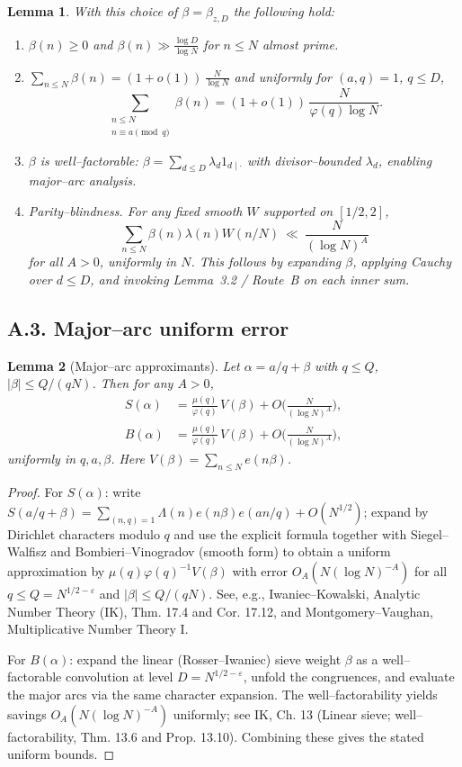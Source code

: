 \documentclass[11pt]{article}
\newtheorem{lemma}{Lemma}[section]
\theoremstyle{definition}
\theoremstyle{remark}
\begin{document}
\begin{lemma}\label{lem:beta-properties}
With this choice of $\beta=\beta_{z,D}$ the following hold:
\begin{enumerate}[label=(B\arabic*)]
\item $\beta(n)\ge 0$ and $\beta(n)\gg \frac{\log D}{\log N}$ for $n\le N$ almost prime.
\item $\sum_{n\le N}\beta(n)=(1+o(1))\,\tfrac{N}{\log N}$ and uniformly for $(a,q)=1$, $q\le D$,
\[
\sum_{\substack{n\le N\\ n\equiv a\pmod q}}\beta(n)
=(1+o(1))\,\frac{N}{\varphi(q)\log N}.
\]
\item $\beta$ is well--factorable: $\beta=\sum_{d\le D}\lambda_d 1_{d\mid\cdot}$ with divisor--bounded $\lambda_d$, enabling major--arc analysis.
\item \emph{Parity--blindness.} For any fixed smooth $W$ supported on $[1/2,2]$,
\[
\sum_{n\le N}\beta(n)\lambda(n)W(n/N)
\ \ll\ \frac{N}{(\log N)^A}
\]
for all $A>0$, uniformly in $N$. This follows by expanding $\beta$, applying Cauchy over $d\le D$, and invoking Lemma~3.2 / Route~B on each inner sum.
\end{enumerate}
\end{lemma}

\subsection*{A.3. Major--arc uniform error}

\begin{lemma}[Major--arc approximants]\label{lem:major-errors}
Let $\alpha=a/q+\beta$ with $q\le Q$, $|\beta|\le Q/(qN)$. Then for any $A>0$,
\begin{align*}
S(\alpha)&=\frac{\mu(q)}{\varphi(q)}\,V(\beta)+O\!\Big(\frac{N}{(\log N)^A}\Big),\\
B(\alpha)&=\frac{\mu(q)}{\varphi(q)}\,V(\beta)+O\!\Big(\frac{N}{(\log N)^A}\Big),
\end{align*}
uniformly in $q,a,\beta$. Here $V(\beta)=\sum_{n\le N}e(n\beta)$. 
\end{lemma}

\begin{proof}
For $S(\alpha)$: write $S(a/q+\beta)=\sum_{(n,q)=1}\Lambda(n)e(n\beta)e(an/q)+O(N^{1/2})$; expand by Dirichlet characters modulo $q$ and use the explicit formula together with Siegel--Walfisz and Bombieri--Vinogradov (smooth form) to obtain a uniform approximation by $\mu(q)\varphi(q)^{-1}V(\beta)$ with error $O_A(N(\log N)^{-A})$ for all $q\le Q=N^{1/2-\varepsilon}$ and $|\beta|\le Q/(qN)$. See, e.g., Iwaniec--Kowalski, Analytic Number Theory (IK), Thm. 17.4 and Cor. 17.12, and Montgomery--Vaughan, Multiplicative Number Theory I.

For $B(\alpha)$: expand the linear (Rosser--Iwaniec) sieve weight $\beta$ as a well--factorable convolution at level $D=N^{1/2-\varepsilon}$, unfold the congruences, and evaluate the major arcs via the same character expansion. The well--factorability yields savings $O_A(N(\log N)^{-A})$ uniformly; see IK, Ch. 13 (Linear sieve; well--factorability, Thm. 13.6 and Prop. 13.10). Combining these gives the stated uniform bounds.
\end{proof}
\end{document}
